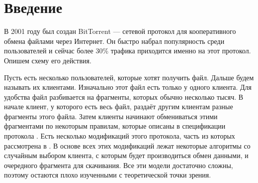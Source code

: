 \documentclass{matmex-diploma-custom}
\theoremstyle{named}
\begin{document}
\maketitle
	
\renewcommand{\contentsname}{Оглавление}
\tableofcontents
\newpage

\section*{Введение}
В 2001 году был создан BitTorrent --- сетевой протокол для кооперативного обмена файлами через Интернет.
Он быстро набрал популярность среди пользователей и сейчас более 30\% трафика приходится именно на этот протокол.
Опишем схему его действия.

Пусть есть несколько пользователей, которые хотят получить файл. Дальше будем называть их клиентами.
Изначально этот файл есть только у одного клиента. 
Для удобства файл разбивается на фрагменты, которых обычно несколько тысяч.
В начале клиент, у которого есть весь файл, раздаёт другим клиентам разные фрагменты этого файла.
Затем клиенты начинают обмениваться этими фрагментами по некоторым правилам, 
которые описаны в спецификации протокола \cite{spec}.
Есть несколько модификаций этого протокола, часть из которых рассмотрена в \cite{cool}.
В основе всех этих модификаций лежат некоторые алгоритмы со случайным выбором клиента, 
с которым будет производиться обмен данными, и очередного фрагмента для скачивания. 
Все эти модели достаточно сложны, поэтому остаются плохо изученными с теоретической точки зрения.
\end{document}
